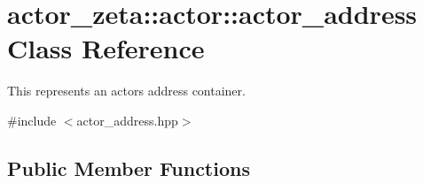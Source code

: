 \hypertarget{classactor__zeta_1_1actor_1_1actor__address}{}\section{actor\+\_\+zeta\+:\+:actor\+:\+:actor\+\_\+address Class Reference}
\label{classactor__zeta_1_1actor_1_1actor__address}


This represents an actor\textquotesingle{}s address container.  




{\ttfamily \#include $<$actor\+\_\+address.\+hpp$>$}

\subsection*{Public Member Functions}
